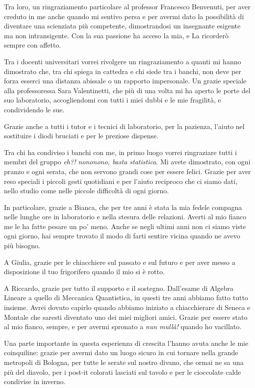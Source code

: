 Tra loro, un ringraziamento particolare al professor Francesco Benvenuti, per aver creduto in me anche quando mi sentivo persa e per avermi dato la possibilità di diventare una scienziata più competente, dimostrandosi un insegnante esigente ma non intransigente. Con la sua passione ha acceso la mia, e La ricorderò sempre con affetto. 

Tra i docenti universitari vorrei rivolgere un ringraziamento a quanti mi hanno dimostrato che, tra chi spiega in cattedra e chi siede tra i banchi, non deve per forza esserci una distanza abissale o un rapporto impersonale. Un grazie speciale alla professoressa Sara Valentinetti, che più di una volta mi ha aperto le porte del suo laboratorio, accogliendomi con tutti i miei dubbi e le mie fragilità, e condividendo le sue. 

Grazie anche a tutti i tutor e i tecnici di laboratorio, per la pazienza, l'aiuto nel sostituire i diodi bruciati e per le preziose dispense.
\medskip

Tra chi ha condiviso i banchi con me, in primo luogo vorrei ringraziare tutti i membri del gruppo \emph{eh?! nononono, basta statistica}. Mi avete dimostrato, con ogni pranzo e ogni serata, che non servono grandi cose per essere felici. Grazie per aver reso speciali i piccoli gesti quotidiani e per l’aiuto reciproco che ci siamo dati, nello studio come nelle piccole difficoltà di ogni giorno. 

In particolare, grazie a Bianca, che per tre anni è stata la mia fedele compagna nelle lunghe ore in laboratorio e nella stesura delle relazioni. Averti al mio fianco me le ha fatte pesare un po’ meno. Anche se negli ultimi anni non ci siamo viste ogni giorno, hai sempre trovato il modo di farti sentire vicina quando ne avevo più bisogno. 

A Giulia, grazie per le chiacchiere sul passato e sul futuro e per aver messo a disposizione il tuo frigorifero quando il mio si è rotto.

A Riccardo, grazie per tutto il supporto e il sostegno. Dall’esame di  Algebra Lineare a quello di Meccanica Quantistica, in questi tre anni abbiamo fatto tutto insieme. Avrei dovuto capirlo quando abbiamo iniziato a chiacchierare di Seneca e Montale che saresti diventato uno dei miei migliori amici. Grazie per essere stato al mio fianco, sempre, e per avermi spronato a \emph{nun mullà!} quando ho vacillato. 

Una parte importante in questa esperienza di crescita l’hanno avuta anche le mie coinquiline: grazie per avermi dato un luogo sicuro in cui tornare nella grande metropoli di Bologna, per tutte le serate sul nostro divano, che ormai ne sa una più del diavolo, per i post-it colorati lasciati sul tavolo e per le cioccolate calde condivise in inverno. 

